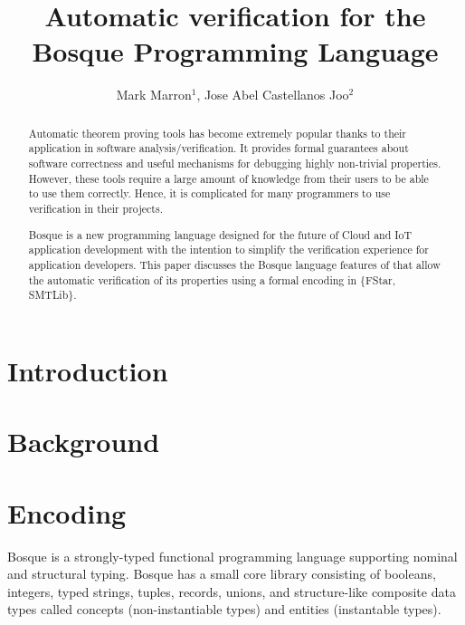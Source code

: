 \documentclass[runningheads]{llncs}
\begin{document}
\title{Automatic verification for the Bosque Programming Language}
%
\author{Mark Marron$^1$,
  Jose Abel Castellanos Joo$^2$}
%
%
%
\maketitle
%
\begin{abstract}  
  Automatic theorem proving tools has become extremely popular thanks to their application in software
  analysis/verification. It provides formal guarantees about software correctness and useful mechanisms
  for debugging highly non-trivial properties. However, these tools
  require a large amount of knowledge from their users to be able to use them correctly. Hence, it is
  complicated for many programmers to use verification in their projects.
  
  Bosque is a new programming language designed for the future of Cloud and IoT application development
  with the intention to simplify the verification experience for application developers.
  This paper discusses the Bosque language features of that allow the automatic verification of its
  properties using a formal encoding in \{FStar, SMTLib\}.
%
\end{abstract}
%
%
%

\section{Introduction}

%
%

\section{Background}

%
%

\section{Encoding}

Bosque is a strongly-typed functional programming language supporting nominal and
structural typing. Bosque has a small core library consisting of booleans, integers,
typed strings, tuples, records, unions, and structure-like composite data types called
concepts (non-instantiable types) and entities (instantable types).
\end{document}
